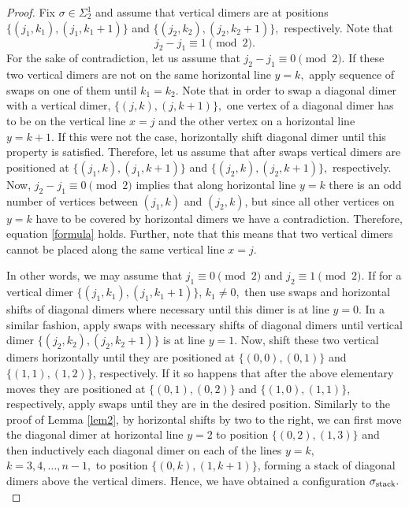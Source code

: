 \documentclass[12pt,reqno]{amsart}
\numberwithin{equation}{section}
\newcommand{\sg}{\sigma}
\begin{document}
\begin{proof}
Fix $\sg\in\Sigma_2^1$ and assume that vertical dimers are at positions $\{(j_1,k_1),(j_1,k_1+1)\}$ and $\{(j_2,k_2),(j_2,k_2+1)\},$ respectively. Note that 
\begin{equation}\label{formula}
j_2-j_1\equiv 1 \pmod 2.
\end{equation}
For the sake of contradiction, let us assume that $j_2-j_1\equiv 0 \pmod 2.$ If these two vertical dimers are not on the same horizontal line $y=k,$ apply sequence of swaps on one of them until $k_1=k_2.$ Note that in order to swap a diagonal dimer with a vertical dimer, $\{(j,k),(j,k+1)\},$ one vertex of a diagonal dimer has to be on the vertical line $x=j$ and the other vertex on a horizontal line $y=k+1.$ If this were not the case, horizontally shift diagonal dimer until this property is satisfied. Therefore, let us assume that after swaps vertical dimers are positioned at $\{(j_1,k),(j_1,k+1)\}$ and $\{(j_2,k),(j_2,k+1)\},$ respectively. Now, $j_2-j_1\equiv 0 \pmod 2$ implies that along horizontal line $y=k$ there is an odd number of vertices between $(j_1,k)$ and $(j_2,k)$, but since all other vertices on $y=k$ have to be covered by horizontal dimers we have a contradiction. Therefore, equation \eqref{formula} holds. Further, note that this means that two vertical dimers  cannot be placed along the same vertical line $x=j.$ 

In other words, we may assume that $j_1\equiv 0 \pmod 2$ and $j_2\equiv 1 \pmod 2.$ If for a vertical dimer $\{(j_1,k_1),(j_1,k_1+1)\}$, $k_1\neq 0,$ then use swaps and horizontal shifts of diagonal dimers where necessary until this dimer is at line $y=0.$ In a similar fashion, apply swaps with necessary shifts of diagonal dimers until vertical dimer $\{(j_2,k_2),(j_2,k_2+1)\}$ is at line $y=1.$ Now, shift these two vertical dimers horizontally until they are positioned at $\{(0,0),(0,1)\}$ and $\{(1,1),(1,2)\}$, respectively. If it so happens that after the above elementary moves they are positioned at $\{(0,1),(0,2)\}$ and $\{(1,0),(1,1)\}$, respectively, apply swaps until they are in the desired position. Similarly to the proof of Lemma \ref{lem2}, by horizontal shifts by two to the right, we can first move the diagonal dimer at horizontal line $y=2$ to position  $\{(0,2), (1,3)\}$ and then inductively each diagonal dimer on each of the lines $y=k,$ $k = 3, 4, \ldots, n-1,$ to position  $\{(0,k), (1,k+1)\}$, forming a stack of diagonal dimers above the vertical dimers. Hence, we have obtained a configuration $\sg_{\rm stack}.$


\end{proof}
\end{document}
